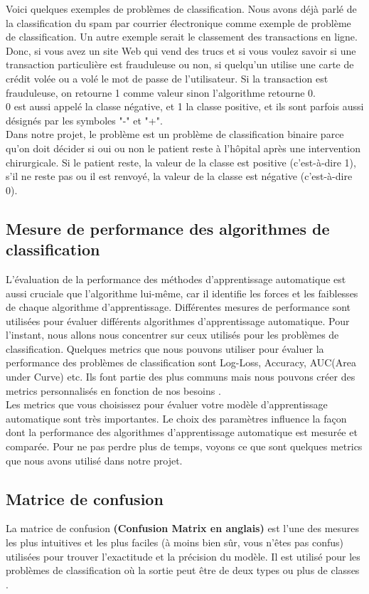 \documentclass[12pt, french]{report}
\begin{document}
Voici quelques exemples de problèmes de classification. Nous avons déjà parlé de la classification du spam par courrier électronique comme exemple de problème de classification. Un autre exemple serait le classement des transactions en ligne. Donc, si vous avez un site Web qui vend des trucs et si vous voulez savoir si une transaction particulière est frauduleuse ou non, si quelqu'un utilise une carte de crédit volée ou a volé le mot de passe de l'utilisateur. Si la transaction est frauduleuse, on retourne 1 comme valeur sinon l'algorithme retourne 0.\\
0 est aussi appelé la classe négative, et 1 la classe positive, et ils sont parfois aussi désignés par les symboles "-" et "+".\\

Dans notre projet, le problème est un problème de classification binaire parce qu'on doit décider si oui ou non le patient reste à l'hôpital après une intervention chirurgicale. Si le patient reste, la valeur de la classe est positive (c'est-à-dire 1), s'il ne reste pas ou il est renvoyé, la valeur de la classe est négative (c'est-à-dire 0).

\subsection{Mesure de performance des algorithmes de classification}
L'évaluation de la performance des méthodes d'apprentissage automatique est aussi cruciale que l'algorithme lui-même, car il identifie les forces et les faiblesses de chaque algorithme d'apprentissage. Différentes mesures de performance sont utilisées pour évaluer différents algorithmes d'apprentissage automatique. Pour l'instant, nous allons nous concentrer sur ceux utilisés pour les problèmes de classification. Quelques metrics que nous pouvons utiliser pour évaluer la performance des problèmes de classification sont Log-Loss, Accuracy, AUC(Area under Curve) etc. Ils font partie des plus communs mais nous pouvons créer des metrics personnalisés en fonction de nos besoins \cite{key17}.\\

Les metrics que vous choisissez pour évaluer votre modèle d'apprentissage automatique sont très importantes. Le choix des paramètres influence la façon dont la performance des algorithmes d'apprentissage automatique est mesurée et comparée. Pour ne pas perdre plus de temps, voyons ce que sont quelques metrics que nous avons utilisé dans notre projet.

\subsection{Matrice de confusion}
La matrice de confusion \textbf{(Confusion Matrix en anglais)} est l'une des mesures les plus intuitives et les plus faciles (à moins bien sûr, vous n'êtes pas confus) utilisées pour trouver l'exactitude et la précision du modèle. Il est utilisé pour les problèmes de classification où la sortie peut être de deux types ou plus de classes \cite{key17}.\\
\end{document}
